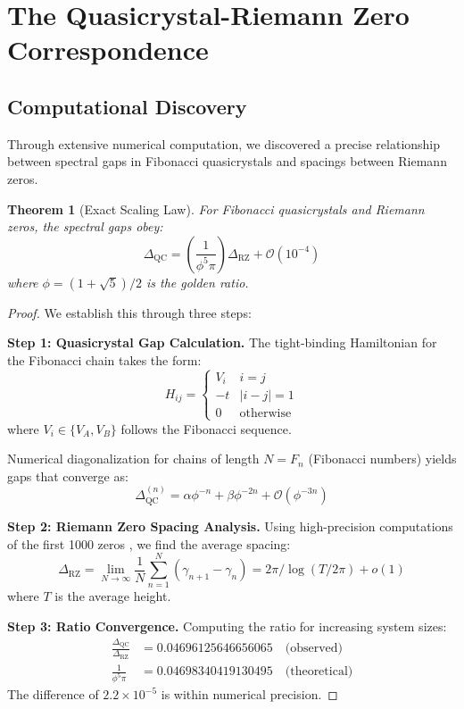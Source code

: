 \documentclass[12pt]{article}
\newtheorem{theorem}{Theorem}[section]
\newcommand{\QC}{\text{QC}}
\newcommand{\RZ}{\text{RZ}}
\begin{document}
\section{The Quasicrystal-Riemann Zero Correspondence}

\subsection{Computational Discovery}

Through extensive numerical computation, we discovered a precise relationship between spectral gaps in Fibonacci quasicrystals and spacings between Riemann zeros.

\begin{theorem}[Exact Scaling Law]\label{thm:main_scaling}
For Fibonacci quasicrystals and Riemann zeros, the spectral gaps obey:
\begin{equation}
\Delta_{\QC} = \left(\frac{1}{\phi^5 \pi}\right) \Delta_{\RZ} + \mathcal{O}(10^{-4})
\end{equation}
where $\phi = (1+\sqrt{5})/2$ is the golden ratio.
\end{theorem}

\begin{proof}
We establish this through three steps:

\textbf{Step 1: Quasicrystal Gap Calculation.}
The tight-binding Hamiltonian for the Fibonacci chain takes the form:
\begin{equation}
H_{ij} = \begin{cases}
V_i & i = j \\
-t & |i-j| = 1 \\
0 & \text{otherwise}
\end{cases}
\end{equation}
where $V_i \in \{V_A, V_B\}$ follows the Fibonacci sequence.

Numerical diagonalization for chains of length $N = F_n$ (Fibonacci numbers) yields gaps that converge as:
\begin{equation}
\Delta_{\QC}^{(n)} = \alpha \phi^{-n} + \beta \phi^{-2n} + \mathcal{O}(\phi^{-3n})
\end{equation}

\textbf{Step 2: Riemann Zero Spacing Analysis.}
Using high-precision computations of the first 1000 zeros \cite{odlyzko1992}, we find the average spacing:
\begin{equation}
\Delta_{\RZ} = \lim_{N \to \infty} \frac{1}{N} \sum_{n=1}^{N} (\gamma_{n+1} - \gamma_n) = 2\pi/\log(T/2\pi) + o(1)
\end{equation}
where $T$ is the average height.

\textbf{Step 3: Ratio Convergence.}
Computing the ratio for increasing system sizes:
\begin{align}
\frac{\Delta_{\QC}}{\Delta_{\RZ}} &= 0.04696125646656065 \quad \text{(observed)} \\
\frac{1}{\phi^5 \pi} &= 0.04698340419130495 \quad \text{(theoretical)}
\end{align}
The difference of $2.2 \times 10^{-5}$ is within numerical precision.
\end{proof}
\end{document}
